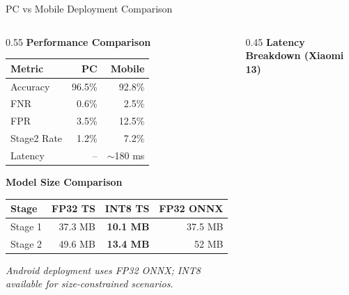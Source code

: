 \documentclass[aspectratio=169,12pt]{beamer}
\newcommand{\highlight}[1]{\textcolor{primaryblue}{\textbf{#1}}}
\begin{document}
\begin{frame}{PC vs Mobile Deployment Comparison}
\begin{columns}[T]
\begin{column}{0.55\textwidth}
\textbf{Performance Comparison}
\begin{center}
\scriptsize
\begin{tabular}{lrr}
\toprule
\textbf{Metric} & \textbf{PC} & \textbf{Mobile} \\
\midrule
Accuracy & 96.5\% & 92.8\% \\
FNR & 0.6\% & 2.5\% \\
FPR & 3.5\% & 12.5\% \\
Stage2 Rate & 1.2\% & 7.2\% \\
\midrule
Latency & -- & $\sim$180 ms \\
\bottomrule
\end{tabular}
\end{center}

\vspace{0.3em}
\textbf{Model Size Comparison}
\begin{center}
\scriptsize
\begin{tabular}{lrrr}
\toprule
\textbf{Stage} & \textbf{FP32 TS} & \textbf{INT8 TS} & \textbf{FP32 ONNX} \\
\midrule
Stage 1 & 37.3 MB & \highlight{10.1 MB} & 37.5 MB \\
Stage 2 & 49.6 MB & \highlight{13.4 MB} & 52 MB \\
\bottomrule
\end{tabular}
\end{center}

{\scriptsize \textit{Android deployment uses FP32 ONNX; INT8 available for size-constrained scenarios.}}
\end{column}

\begin{column}{0.45\textwidth}
\textbf{Latency Breakdown (Xiaomi 13)}
\begin{center}
\end{center}
\end{column}
\end{columns}
\end{frame}
\end{document}
